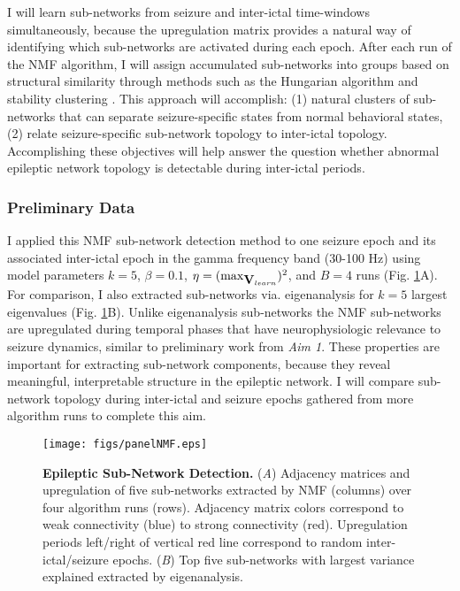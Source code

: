 I will learn sub-networks from seizure and inter-ictal time-windows simultaneously, because the upregulation matrix provides a natural way of identifying which sub-networks are activated during each epoch. After each run of the NMF algorithm, I will assign accumulated sub-networks into groups based on structural similarity through methods such as the Hungarian algorithm \cite{munkres1957algorithms, kuhn2005hungarian} and stability clustering \cite{bellec2010multi-level}. This approach will accomplish: (1) natural clusters of sub-networks that can separate seizure-specific states from normal behavioral states, (2) relate seizure-specific sub-network topology to inter-ictal topology. Accomplishing these objectives will help answer the question whether abnormal epileptic network topology is detectable during inter-ictal periods. 

\subsubsection{Preliminary Data}
I applied this NMF sub-network detection method to one seizure epoch and its associated inter-ictal epoch in the gamma frequency band (30-100 Hz) using model parameters $k=5$, $\beta=0.1$, $\eta=(\max_{\mathbf{\displaystyle V}_{learn}})^2$, and $B=4$ runs (Fig. \ref{fig:nmf}A). For comparison, I also extracted sub-networks via. eigenanalysis for $k=5$ largest eigenvalues (Fig. \ref{fig:nmf}B). Unlike eigenanalysis sub-networks the NMF sub-networks are upregulated during temporal phases that have neurophysiologic relevance to seizure dynamics, similar to preliminary work from \textit{Aim 1}. These properties are important for extracting sub-network components, because they reveal meaningful, interpretable structure in the epileptic network. I will compare sub-network topology during inter-ictal and seizure epochs gathered from more algorithm runs to complete this aim. 

\begin{figure}
\centering
\texttt{[image: figs/panelNMF.eps]}
\caption[Epileptic Sub-Networks]{\textbf{Epileptic Sub-Network Detection.} (\textit{A}) Adjacency matrices and upregulation of five sub-networks extracted by NMF (columns) over four algorithm runs (rows). Adjacency matrix colors correspond to weak connectivity (blue) to strong connectivity (red). Upregulation periods left/right of vertical red line correspond to random inter-ictal/seizure epochs. (\textit{B}) Top five sub-networks with largest variance explained extracted by eigenanalysis.}
\label{fig:nmf}
\end{figure}
